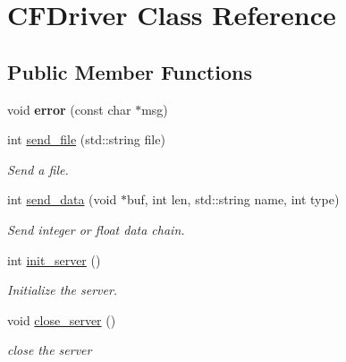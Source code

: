 \hypertarget{class_c_f_driver}{}\section{C\+F\+Driver Class Reference}
\label{class_c_f_driver}
\subsection*{Public Member Functions}
\begin{DoxyCompactItemize}
\item 
\mbox{\label{class_c_f_driver_a0e5e19f1775da0e8d8a7e6f0d27dac2d}} 
void {\bfseries error} (const char $\ast$msg)
\item 
\mbox{\label{class_c_f_driver_afa9d86fbcb0997773feba442d62fc5dc}} 
int \mbox{\hyperlink{class_c_f_driver_afa9d86fbcb0997773feba442d62fc5dc}{send\+\_\+file}} (std\+::string file)
\begin{DoxyCompactList}\small\item\em Send a file. \end{DoxyCompactList}\item 
\mbox{\label{class_c_f_driver_a7667bc57137b8a1c3e9ed4dea191222b}} 
int \mbox{\hyperlink{class_c_f_driver_a7667bc57137b8a1c3e9ed4dea191222b}{send\+\_\+data}} (void $\ast$buf, int len, std\+::string name, int type)
\begin{DoxyCompactList}\small\item\em Send integer or float data chain. \end{DoxyCompactList}\item 
\mbox{\label{class_c_f_driver_afc59b3c217b7031eaad6a193ae5c9790}} 
int \mbox{\hyperlink{class_c_f_driver_afc59b3c217b7031eaad6a193ae5c9790}{init\+\_\+server}} ()
\begin{DoxyCompactList}\small\item\em Initialize the server. \end{DoxyCompactList}\item 
\mbox{\label{class_c_f_driver_a2c5755e2a5257d5a3f03694e2c1f0a7c}} 
void \mbox{\hyperlink{class_c_f_driver_a2c5755e2a5257d5a3f03694e2c1f0a7c}{close\+\_\+server}} ()
\begin{DoxyCompactList}\small\item\em close the server \end{DoxyCompactList}\end{DoxyCompactItemize}
